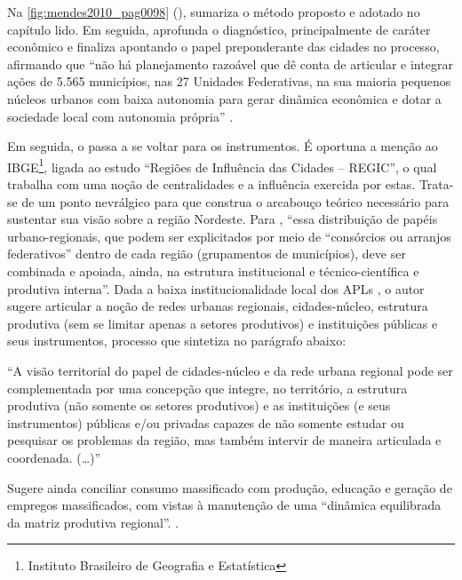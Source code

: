 \documentclass[
article,			%
11pt,				%
oneside,			%
a4paper,			%
english,			%
brazil,				%
sumario=tradicional
]{abntex2}
\begin{document}
	Na \autoref{fig:mendes2010_pag0098} (),  sumariza o método proposto e adotado no capítulo lido. Em seguida, aprofunda o diagnóstico, principalmente de caráter econômico e finaliza apontando o papel preponderante das cidades no processo, afirmando que ``não há planejamento razoável que dê conta de articular e integrar ações de 5.565 municípios, nas 27 Unidades Federativas, na sua maioria pequenos núcleos urbanos com baixa autonomia para gerar dinâmica econômica e dotar a sociedade local com autonomia própria'' \cite[p. 101]{mendes2012}.
	
	Em seguida, o  passa a se voltar para os instrumentos. É oportuna a menção ao IBGE\footnote{Instituto Brasileiro de Geografia e Estatística}, ligada ao estudo ``Regiões de Influência das Cidades – REGIC'', o qual trabalha com uma noção de centralidades e a influência exercida por estas. Trata-se de um ponto nevrálgico para que  construa o arcabouço teórico necessário para sustentar sua visão sobre a região Nordeste. Para , ``essa distribuição de papéis urbano-regionais, que podem ser explicitados por meio de “consórcios ou arranjos federativos” dentro de cada região (grupamentos de municípios), deve ser combinada e apoiada, ainda,
	na estrutura institucional e técnico-científica e produtiva interna''. Dada a baixa institucionalidade local dos APLs \cite[p. 106]{mendes2012}, o autor sugere articular a noção de redes urbanas regionais, cidades-núcleo, estrutura produtiva (sem se limitar apenas a setores produtivos) e instituições públicas e seus instrumentos, processo que sintetiza no parágrafo abaixo:
	
	\begin{citacao}
		``A visão territorial do papel de cidades-núcleo e da rede urbana regional pode ser complementada por uma concepção que integre, no território, a estrutura produtiva (não somente os setores produtivos) e as instituições (e seus instrumentos) públicas e/ou privadas capazes de não somente estudar ou pesquisar os	problemas da região, mas também intervir de maneira articulada e coordenada. (\dots)'' \cite[p. 106]{mendes2012}
	\end{citacao}
	
	Sugere ainda conciliar consumo massificado com produção, educação e geração de empregos massificados, com vistas à manutenção de uma ``dinâmica equilibrada da matriz produtiva regional''. \cite[p. 107]{mendes2012}.
	
\end{document}
